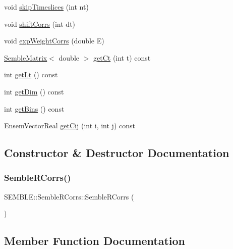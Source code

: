 \begin{DoxyCompactItemize}
\item 
void \mbox{\hyperlink{classSEMBLE_1_1SembleRCorrs_aec2e6a0104168e83d6f95be39187dd01}{skip\+Timeslices}} (int nt)
\item 
void \mbox{\hyperlink{classSEMBLE_1_1SembleRCorrs_a7d8a67b5a5bf59715606b694890dba92}{shift\+Corrs}} (int dt)
\item 
void \mbox{\hyperlink{classSEMBLE_1_1SembleRCorrs_a43b4d94666799da7276b526e47adcb9d}{exp\+Weight\+Corrs}} (double E)
\item 
\mbox{\hyperlink{structSEMBLE_1_1SembleMatrix}{Semble\+Matrix}}$<$ double $>$ \mbox{\hyperlink{classSEMBLE_1_1SembleRCorrs_abd841b0619a827de775801484003e020}{get\+Ct}} (int t) const
\item 
int \mbox{\hyperlink{classSEMBLE_1_1SembleRCorrs_a613916dc6047b732aabfffb6dcfe03c5}{get\+Lt}} () const
\item 
int \mbox{\hyperlink{classSEMBLE_1_1SembleRCorrs_a30b37ab8e6c87236d82e32e224418c54}{get\+Dim}} () const
\item 
int \mbox{\hyperlink{classSEMBLE_1_1SembleRCorrs_ae1f2b28770210f22534588eb83b3c36e}{get\+Bins}} () const
\item 
Ensem\+Vector\+Real \mbox{\hyperlink{classSEMBLE_1_1SembleRCorrs_ab815db4bf9e18b99168c8870cb6dbee9}{get\+Cij}} (int i, int j) const
\end{DoxyCompactItemize}


\subsection{Constructor \& Destructor Documentation}
\mbox{\label{classSEMBLE_1_1SembleRCorrs_af1bf90ab982a17e2db5454fda91a1a55}} 
\subsubsection{\texorpdfstring{SembleRCorrs()}{SembleRCorrs()}}
{\footnotesize\ttfamily S\+E\+M\+B\+L\+E\+::\+Semble\+R\+Corrs\+::\+Semble\+R\+Corrs (\begin{DoxyParamCaption}{ }\end{DoxyParamCaption})}



\subsection{Member Function Documentation}
\mbox{\label{classSEMBLE_1_1SembleRCorrs_aced86d0b621c0bd4f0a6a3535ac2b867}} 
